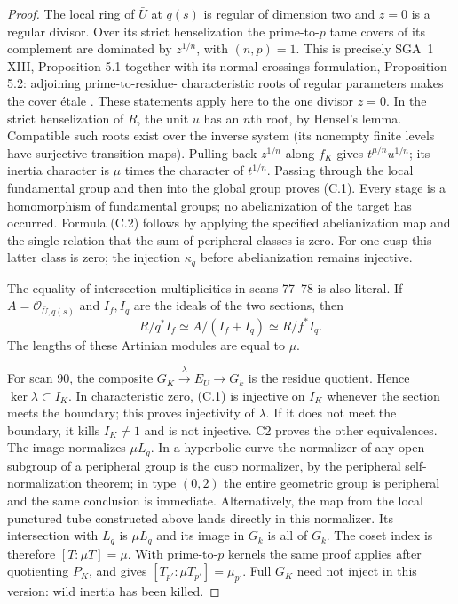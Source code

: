 \begin{proof}
The local ring of $\bar U$ at $q(s)$ is regular of dimension two and $z=0$
is a regular divisor. Over its strict henselization the prime-to-$p$ tame
covers of its complement are dominated by $z^{1/n}$, with $(n,p)=1$.
This is precisely SGA~1 XIII, Proposition 5.1 together with its
normal-crossings formulation, Proposition 5.2: adjoining prime-to-residue-
characteristic roots of regular parameters makes the cover \'etale
\cite{CF_SGA1}. These statements apply here to the one divisor $z=0$.
In the strict henselization of $R$, the unit $u$ has an $n$th root, by
Hensel's lemma. Compatible such roots exist over the inverse system
(its nonempty finite levels have surjective transition maps). Pulling
back $z^{1/n}$ along $f_K$ gives $t^{\mu/n}u^{1/n}$; its inertia character
is $\mu$ times the character of $t^{1/n}$. Passing through the local
fundamental group and then into the global group proves (C.1). Every
stage is a homomorphism of fundamental groups; no abelianization of the
target has occurred. Formula (C.2) follows by applying the specified
abelianization map and the single relation that the sum of peripheral
classes is zero. For one cusp this latter class is zero; the injection
$\kappa_q$ before abelianization remains injective.

The equality of intersection multiplicities in scans 77--78 is also
literal. If $A=\mathcal O_{\bar U,q(s)}$ and $I_f,I_q$ are the ideals of
the two sections, then
\[
 R/q^*I_f\simeq A/(I_f+I_q)\simeq R/f^*I_q.
\]
The lengths of these Artinian modules are equal to $\mu$.

For scan 90, the composite $G_K\xrightarrow\lambda E_U\to G_k$ is the
residue quotient. Hence $\ker\lambda\subset I_K$. In characteristic zero,
(C.1) is injective on $I_K$ whenever the section meets the boundary; this
proves injectivity of $\lambda$. If it does not meet the boundary, it
kills $I_K\ne1$ and is not injective. C2 proves the other equivalences.
The image normalizes $\mu L_q$. In a hyperbolic curve the normalizer of
any open subgroup of a peripheral group is the cusp normalizer, by the
peripheral self-normalization theorem; in type $(0,2)$ the entire
geometric group is peripheral and the same conclusion is immediate.
Alternatively, the map from the local punctured tube constructed above
lands directly in this normalizer. Its intersection with $L_q$ is
$\mu L_q$ and its image in $G_k$ is all of $G_k$. The coset index is
therefore $[T:\mu T]=\mu$. With prime-to-$p$ kernels the same proof
applies after quotienting $P_K$, and gives $[T_{p'}:\mu T_{p'}]=\mu_{p'}$.
Full $G_K$ need not inject in this version: wild inertia has been killed.


\end{proof}
